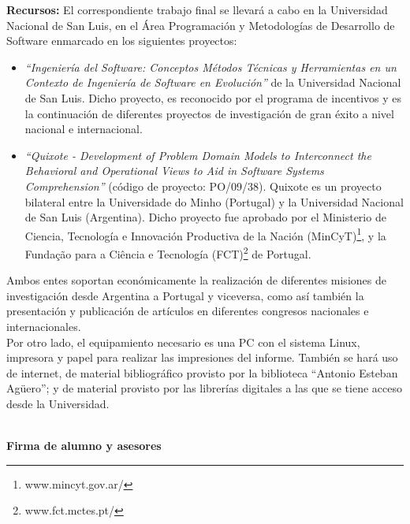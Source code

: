 \documentclass[a4paper,12pt]{report}
\begin{document}
\pagebreak

{\Large \textbf{Recursos:}}
\vskip0.5cm
\hspace{0.5cm}El correspondiente trabajo final se llevará a cabo en la Universidad Nacional de San Luis, en el Área Programación y Metodologías de Desarrollo de Software enmarcado en los siguientes proyectos:

\begin{itemize}
\renewcommand{\labelitemi}{$\diamondsuit$}%

\item \textit{“Ingeniería del Software: Conceptos Métodos Técnicas y 
Herramientas en un Contexto de Ingeniería de Software en Evolución”} de la Universidad 
Nacional de San Luis. 
Dicho proyecto, es reconocido por el programa de incentivos y es la continuación de 
diferentes proyectos de investigación de gran éxito a nivel nacional e internacional.

\item \textit{“Quixote - Development of Problem Domain Models to Interconnect the Behavioral and Operational Views to Aid in Software Systems Comprehension”} (código de proyecto: PO/09/38).  Quixote es un proyecto bilateral entre la Universidade do Minho (Portugal) y la Universidad Nacional de San Luis (Argentina). Dicho proyecto fue aprobado por el Ministerio de Ciencia, Tecnología e Innovación Productiva de la Nación (MinCyT)\footnote[1]{www.mincyt.gov.ar/}, y la Fundação para a Ciência e Tecnología (FCT)\footnote[2]{www.fct.mctes.pt/} de Portugal. 

\end{itemize}

\hspace{0.5cm}Ambos entes soportan económicamente la realización de diferentes misiones de investigación desde Argentina a Portugal y viceversa, como así también la presentación y publicación de artículos en diferentes congresos nacionales e internacionales.\\

\hspace{0.5cm}Por otro lado, el equipamiento necesario es una PC con el sistema Linux, impresora y papel para realizar las impresiones del informe. También se hará uso de internet, de material bibliográfico provisto por la biblioteca “Antonio Esteban Agüero”; y  de material provisto por las librerías digitales a las que se tiene acceso desde la Universidad.




\renewcommand{\bibname}{\vspace{-3cm} \Large \textbf{Bibliografía}}
\setlength{\bibsep}{1.5pt}

\nocite{*}%

{\Large \textbf{\\Firma de alumno y asesores}}
\end{document}
